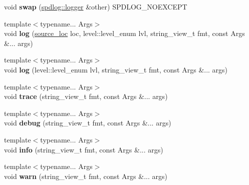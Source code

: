 \begin{DoxyCompactItemize}
\item 
\mbox{\label{classspdlog_1_1logger_ae051dea63dc86dd5bb30106ee3b32404}} 
void {\bfseries swap} (\hyperlink{classspdlog_1_1logger}{spdlog\+::logger} \&other) S\+P\+D\+L\+O\+G\+\_\+\+N\+O\+E\+X\+C\+E\+PT
\item 
\mbox{\label{classspdlog_1_1logger_a3471d3724d9b24101854d125bf4eefbc}} 
{\footnotesize template$<$typename... Args$>$ }\\void {\bfseries log} (\hyperlink{structspdlog_1_1source__loc}{source\+\_\+loc} loc, level\+::level\+\_\+enum lvl, string\+\_\+view\+\_\+t fmt, const Args \&... args)
\item 
\mbox{\label{classspdlog_1_1logger_a0dd0b3ef5ab7f7e5f2981d02970c3afe}} 
{\footnotesize template$<$typename... Args$>$ }\\void {\bfseries log} (level\+::level\+\_\+enum lvl, string\+\_\+view\+\_\+t fmt, const Args \&... args)
\item 
\mbox{\label{classspdlog_1_1logger_aeac79ee1eef7222fb7cbe113591d05d0}} 
{\footnotesize template$<$typename... Args$>$ }\\void {\bfseries trace} (string\+\_\+view\+\_\+t fmt, const Args \&... args)
\item 
\mbox{\label{classspdlog_1_1logger_a832138e6c48b61749dae4b27014a5559}} 
{\footnotesize template$<$typename... Args$>$ }\\void {\bfseries debug} (string\+\_\+view\+\_\+t fmt, const Args \&... args)
\item 
\mbox{\label{classspdlog_1_1logger_afdc5bd09fc182b2bf49e076b617e2e20}} 
{\footnotesize template$<$typename... Args$>$ }\\void {\bfseries info} (string\+\_\+view\+\_\+t fmt, const Args \&... args)
\item 
\mbox{\label{classspdlog_1_1logger_a3e08f82e5d75fee6588750f6a431cdad}} 
{\footnotesize template$<$typename... Args$>$ }\\void {\bfseries warn} (string\+\_\+view\+\_\+t fmt, const Args \&... args)
\item 
\mbox{\label{classspdlog_1_1logger_a0bd21d3580b058a11147253617d07d9f}} 

\end{DoxyCompactItemize}

